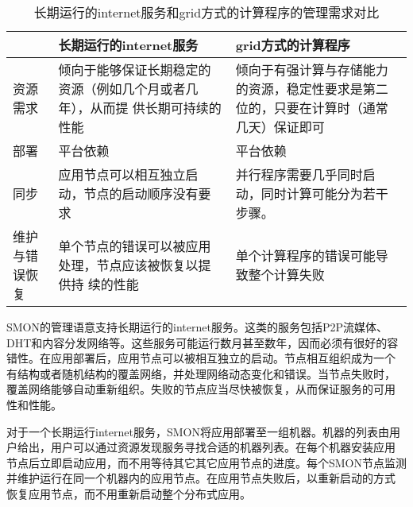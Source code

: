 \begin{table*}
\small
\centering
\caption{长期运行的internet服务和grid方式的计算程序的管理需求对比}
\label{fig:app-man-req}
\begin{tabular}{lp{5cm}p{5cm}}

\toprule[1.5pt]

 & 长期运行的internet服务 & grid方式的计算程序 \\

\midrule[1pt]

资源需求 & 

倾向于能够保证长期稳定的资源（例如几个月或者几年），从而提
供长期可持续的性能 

& 倾向于有强计算与存储能力的资源，稳定性要求是第二
位的，只要在计算时（通常几天）保证即可 \\

\midrule[1pt]

部署 & 平台依赖 & 平台依赖 \\

\midrule[1pt]

同步 & 应用节点可以相互独立启动，节点的启动顺序没有要求

& 并行程序需要几乎同时启动，同时计算可能分为若干步骤。\\
\midrule[1pt]

维护与错误恢复 

& 单个节点的错误可以被应用处理，节点应该被恢复以提供持
续的性能 

&
单个计算程序的错误可能导致整个计算失败 \\

\bottomrule[1.5pt]

\end{tabular}
\end{table*}

SMON的管理语意支持长期运行的internet服务。这类的服务包括P2P流媒体、
DHT和内容分发网络等。这些服务可能运行数月甚至数年，因而必须有很好的容
错性。在应用部署后，应用节点可以被相互独立的启动。节点相互组织成为一个
有结构或者随机结构的覆盖网络，并处理网络动态变化和错误。当节点失败时，
覆盖网络能够自动重新组织。失败的节点应当尽快被恢复，从而保证服务的可用
性和性能。

对于一个长期运行internet服务，SMON将应用部署至一组机器。机器的列表由用
户给出，用户可以通过资源发现服务寻找合适的机器列表。在每个机器安装应用
节点后立即启动应用，而不用等待其它其它应用节点的进度。每个SMON节点监测
并维护运行在同一个机器内的应用节点。在应用节点失败后，以重新启动的方式
恢复应用节点，而不用重新启动整个分布式应用。

